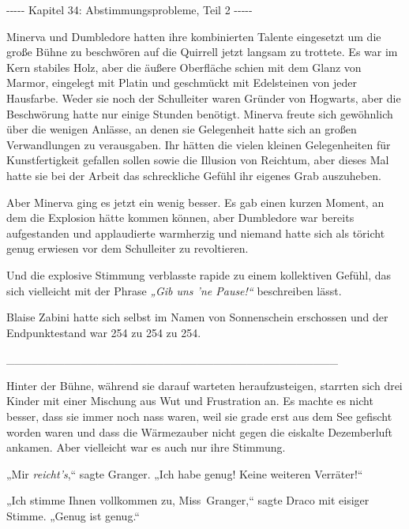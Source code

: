 

\hypertarget{abstimmungsprobleme-teil-2}{%

-\/-\/-\/-\/- Kapitel 34: Abstimmungsprobleme, Teil 2 -\/-\/-\/-\/-

Minerva und Dumbledore hatten ihre kombinierten Talente eingesetzt um die große Bühne zu beschwören auf die Quirrell jetzt langsam zu trottete. Es war im Kern stabiles Holz, aber die äußere Oberfläche schien mit dem Glanz von Marmor, eingelegt mit Platin und geschmückt mit Edelsteinen von jeder Hausfarbe. Weder sie noch der Schulleiter waren Gründer von Hogwarts, aber die Beschwörung hatte nur einige Stunden benötigt. Minerva freute sich gewöhnlich über die wenigen Anlässe, an denen sie Gelegenheit hatte sich an großen Verwandlungen zu verausgaben. Ihr hätten die vielen kleinen Gelegenheiten für Kunstfertigkeit gefallen sollen sowie die Illusion von Reichtum, aber dieses Mal hatte sie bei der Arbeit das schreckliche Gefühl ihr eigenes Grab auszuheben.

Aber Minerva ging es jetzt ein wenig besser. Es gab einen kurzen Moment, an dem die Explosion hätte kommen können, aber Dumbledore war bereits aufgestanden und applaudierte warmherzig und niemand hatte sich als töricht genug erwiesen vor dem Schulleiter zu revoltieren.

Und die explosive Stimmung verblasste rapide zu einem kollektiven Gefühl, das sich vielleicht mit der Phrase \emph{„Gib uns 'ne Pause!“} beschreiben lässt.

Blaise Zabini hatte sich selbst im Namen von Sonnenschein erschossen und der Endpunktestand war 254 zu 254 zu 254.

\_\_\_\_\_\_\_\_\_\_\_\_\_\_\_\_\_\_\_\_\_\_\_\_\_\_\_\_\_\_\_\_\_\_\_\_\_\_\_\_

Hinter der Bühne, während sie darauf warteten heraufzusteigen, starrten sich drei Kinder mit einer Mischung aus Wut und Frustration an. Es machte es nicht besser, dass sie immer noch nass waren, weil sie grade erst aus dem See gefischt worden waren und dass die Wärmezauber nicht gegen die eiskalte Dezemberluft ankamen. Aber vielleicht war es auch nur ihre Stimmung.

„Mir \emph{reicht's},“ sagte Granger. „Ich habe genug! Keine weiteren Verräter!“

„Ich stimme Ihnen vollkommen zu, Miss~Granger,“ sagte Draco mit eisiger Stimme. „Genug ist genug.“

}
